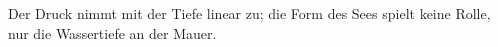 Der Druck nimmt mit der Tiefe linear zu; die Form des Sees spielt keine Rolle, nur die Wassertiefe an der Mauer.
